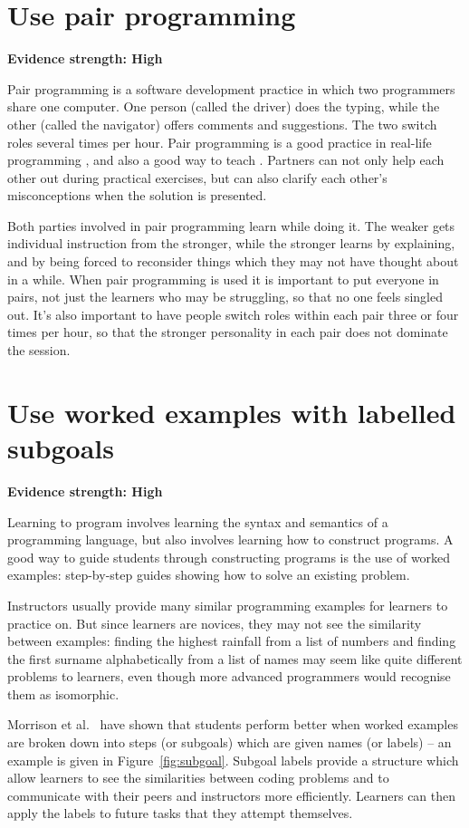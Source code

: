 \documentclass[10pt,letterpaper]{article}
\newcommand{\rulemajor}[2]{\section{#1}\label{#2}}
\newcommand{\evidence}[1]{\vspace{-0.3cm}\textbf{Evidence strength: #1}\vspace{0.5cm}}
\begin{document}
\rulemajor{Use pair programming}{pair-programming}
\evidence{High}

Pair programming is a software development practice
in which two programmers share one computer.
One person (called the driver) does the typing,
while the other (called the navigator) offers comments and suggestions.
The two switch roles several times per hour.
Pair programming is a good practice in real-life programming \cite{hannay},
and also a good way to teach \cite{mcdowell}.
Partners can not only help each other out during practical exercises,
but can also clarify each other's misconceptions when the solution is presented.

Both parties involved in pair programming learn while doing it.
The weaker gets individual instruction from the stronger,
while the stronger learns by explaining,
and by being forced to reconsider things which they may not have thought about in a while.
When pair programming is used it is important to put everyone in pairs,
not just the learners who may be struggling,
so that no one feels singled out.
It's also important to have people switch roles within each pair three or four times per hour,
so that the stronger personality in each pair does not dominate the session.

\rulemajor{Use worked examples with labelled subgoals}{worked-examples}
\evidence{High}

Learning to program involves learning the syntax and semantics of a programming language,
but also involves learning how to construct programs.
A good way to guide students through constructing programs is the use of worked examples:
step-by-step guides showing how to solve an existing problem.

Instructors usually provide many similar programming examples for learners to practice on.
But since learners are novices,
they may not see the similarity between examples:
finding the highest rainfall from a list of numbers and
finding the first surname alphabetically from a list of names
may seem like quite different problems to learners,
even though more advanced programmers would recognise them as isomorphic.

Morrison et al.~\cite{morrison-subgoals,morrison-parsons,margulieux} have shown that students perform better
when worked examples are broken down into steps (or subgoals)
which are given names (or labels) -- an example is given in Figure~\ref{fig:subgoal}.
Subgoal labels provide a structure which allow learners to see the similarities between coding problems and to communicate with their peers and instructors more efficiently.  Learners can then apply the labels to future tasks that they attempt themselves.
\end{document}
